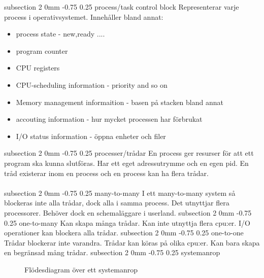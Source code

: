\documentclass[a4paper,11pt]{article}
\makeatletter
\renewcommand{\subsection}{\@startsection
   {subsection}%
   {2}%
   {0mm}%
   {-0.75\baselineskip}%
   {0.25\baselineskip}%
   {\rmfamily\normalfont\slshape\normalsize}}%
\makeatother
\begin{document}
\subsection{process/task control block}
Representerar varje process i operativsystemet. Innehåller bland annat:
\begin{itemize}
\item process state - new,ready ....
\item program counter
\item CPU registers
\item CPU-scheduling information - priority and so on
\item Memory management informaition - basen på stacken bland annat
\item accouting information - hur mycket processen har förbrukat
\item I/O status information - öppna enheter och filer
\end{itemize}
\subsection{processer/trådar}
En process ger resurser för att ett program ska kunna slutföras. Har ett eget adressutrymme och en egen pid. En tråd existerar inom en process och en process kan ha flera trådar. \\ \\
\subsection{many-to-many}
I ett many-to-many system så blockeras inte alla trådar, dock alla i samma process. Det utnyttjar flera processorer. Behöver dock en schemaläggare i userland.
\subsection{one-to-many}
Kan skapa många trådar. Kan inte utnyttja flera cpu:er. I/O operationer kan blockera alla trådar.
\subsection{one-to-one}
Trådar blockerar inte varandra. Trådar kan köras på olika cpu:er. Kan bara skapa en begränsad mång trådar.
\subsection{systemanrop}
\begin{figure}[H]
\scalebox{0.8}{}
\caption{Flödesdiagram över ett systemanrop} 
\end{figure}
\end{document}
